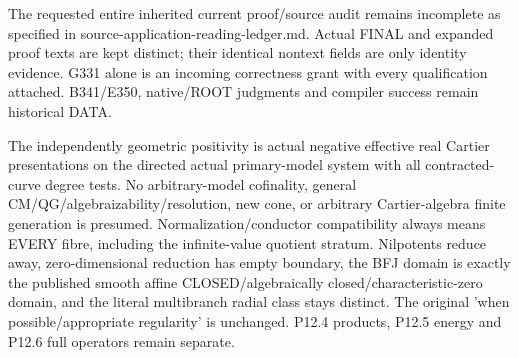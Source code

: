 \documentclass[11pt]{article}
\begin{document}
\begin{RetainedDATA}
The requested entire inherited current proof/source audit remains incomplete as specified in source-application-reading-ledger.md. Actual FINAL and expanded proof texts are kept distinct; their identical nontext fields are only identity evidence. G331 alone is an incoming correctness grant with every qualification attached. B341/E350, native/ROOT judgments and compiler success remain historical DATA.

The independently geometric positivity is actual negative effective real Cartier presentations on the directed actual primary-model system with all contracted-curve degree tests. No arbitrary-model cofinality, general CM/QG/algebraizability/resolution, new cone, or arbitrary Cartier-algebra finite generation is presumed. Normalization/conductor compatibility always means EVERY fibre, including the infinite-value quotient stratum. Nilpotents reduce away, zero-dimensional reduction has empty boundary, the BFJ domain is exactly the published smooth affine CLOSED/algebraically closed/characteristic-zero domain, and the literal multibranch radial class stays distinct. The original 'when possible/appropriate regularity' is unchanged. P12.4 products, P12.5 energy and P12.6 full operators remain separate.

\end{RetainedDATA}
\end{document}
